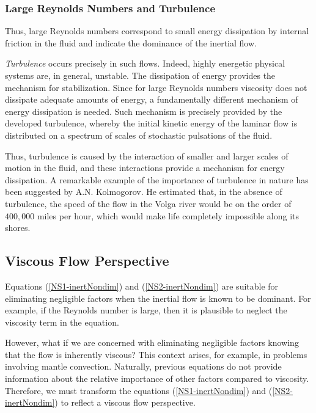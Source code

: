\subsubsection{Large Reynolds Numbers and Turbulence}

Thus, large Reynolds numbers correspond to small energy dissipation by internal friction in the fluid and indicate the dominance of the inertial flow. 

\emph{Turbulence} occurs precisely in such flows. Indeed, highly energetic physical systems are, in general, unstable. The dissipation of energy provides the mechanism for stabilization. Since for large Reynolds numbers viscosity does not dissipate adequate amounts of energy, a fundamentally different mechanism of energy dissipation is needed. Such mechanism is precisely provided by the developed turbulence, whereby the initial kinetic energy of the laminar flow is distributed on a spectrum of scales of stochastic pulsations of the fluid.

Thus, turbulence is caused by the interaction of smaller and larger scales of motion in the fluid, and these interactions provide a mechanism for energy dissipation. A remarkable example of the importance of turbulence in nature has been suggested by A.N. Kolmogorov\cite[pp. 185-186]{barenblatt_fracture}. He estimated that, in the absence of turbulence, the speed of the flow in the Volga river would be on the order of $400, 000$ miles per hour, which would make life completely impossible along its shores.

\subsection{Viscous Flow Perspective}

Equations (\ref{NS1-inertNondim}) and (\ref{NS2-inertNondim}) are suitable for eliminating negligible factors when the inertial flow is known to be dominant. For example, if the Reynolds number is large, then it is plausible to neglect the viscosity term in the equation. 

However, what if we are concerned with eliminating negligible factors knowing that the flow is inherently viscous? This context arises, for example, in problems involving mantle convection. Naturally, previous equations do not provide information about the relative importance of other factors compared to viscosity. Therefore, we must transform the equations (\ref{NS1-inertNondim}) and (\ref{NS2-inertNondim}) to reflect a viscous flow perspective.

